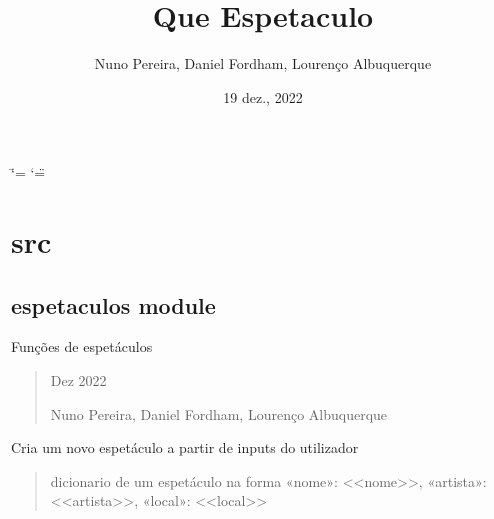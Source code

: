 \documentclass[letterpaper,10pt,portuges]{sphinxmanual}
\title{Que Espetaculo}
\date{19 dez., 2022}
\author{Nuno Pereira, Daniel Fordham, Lourenço Albuquerque}
\begin{document}
\ifdefined\shorthandoff
  \ifnum\catcode`\=\string=\active\shorthandoff{=}\fi
  \ifnum\catcode`\"=\active{}\fi
\fi

\pagestyle{empty}
\sphinxmaketitle
\pagestyle{plain}
\sphinxtableofcontents
\pagestyle{normal}
\label{\detokenize{index::doc}}


\sphinxstepscope


\chapter{src}
\label{\detokenize{modules:src}}\label{\detokenize{modules::doc}}
\sphinxstepscope


\section{espetaculos module}
\label{\detokenize{espetaculos:module-espetaculos}}\label{\detokenize{espetaculos:espetaculos-module}}\label{\detokenize{espetaculos::doc}}
\sphinxAtStartPar
Funções de espetáculos
\begin{quote}\begin{description}
 Dez 2022


\sphinxAtStartPar
Nuno Pereira, Daniel Fordham, Lourenço Albuquerque

\end{description}\end{quote}

\begin{fulllineitems}
\label{\detokenize{espetaculos:espetaculos.criar_espetaculo}}
\pysigstartsignatures
{}
\pysigstopsignatures
\sphinxAtStartPar
Cria um novo espetáculo a partir de inputs do utilizador
\begin{quote}\begin{description}
\sphinxAtStartPar
dicionario de um espetáculo na forma
«nome»: \textless{}\textless{}nome\textgreater{}\textgreater{}, «artista»: \textless{}\textless{}artista\textgreater{}\textgreater{}, «local»: \textless{}\textless{}local\textgreater{}\textgreater{}

\end{description}\end{quote}

\end{fulllineitems}
\end{document}
